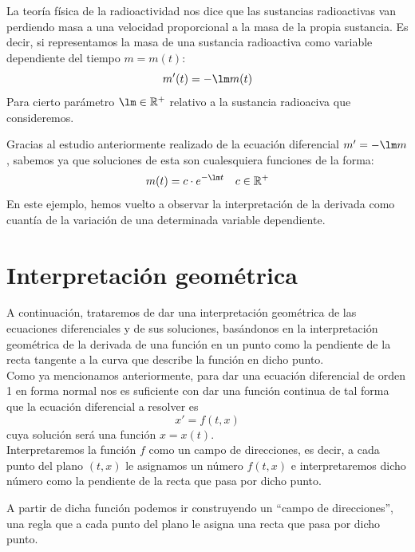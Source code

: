 \begin{ejemplo}
    La teoría física de la radioactividad nos dice que las sustancias radioactivas van perdiendo masa a una velocidad proporcional a la masa de la propia sustancia. Es decir, si representamos la masa de una sustancia radioactiva como variable dependiente del tiempo $m=m(t)$:
    \begin{equation*}
        m'(t) = -\lm m(t)
    \end{equation*}
    Para cierto parámetro $\lm \in \mathbb{R}^+$ relativo a la sustancia radioaciva que consideremos.

    Gracias al estudio anteriormente realizado de la ecuación diferencial $m' = -\lm m$, sabemos ya que soluciones de esta son cualesquiera funciones de la forma:
    \begin{equation*}
        m(t) = c\cdot e^{-\lm t}\quad c\in \mathbb{R}^+
    \end{equation*}
En este ejemplo, hemos vuelto a observar la interpretación de la derivada como cuantía de la variación de una determinada variable dependiente.
\end{ejemplo}

\section{Interpretación geométrica}
A continuación, trataremos de dar una interpretación geométrica de las ecuaciones diferenciales y de sus soluciones, basándonos en la interpretación geométrica de la derivada de una función en un punto como la pendiente de la recta tangente a la curva que describe la función en dicho punto.\\

Como ya mencionamos anteriormente, para dar una ecuación diferencial de orden 1 en forma normal nos es suficiente con dar una función
continua de tal forma que la ecuación diferencial a resolver es
\begin{equation*}
    x' = f(t,x)
\end{equation*}
cuya solución será una función $x = x(t)$.\\

Interpretaremos la función $f$ como un campo de direcciones, es decir, a cada punto del plano $(t,x)$ le asignamos un número $f(t,x)$ e interpretaremos dicho número como la pendiente de la recta que pasa por dicho punto.

A partir de dicha función podemos ir construyendo un ``campo de direcciones'', una regla que a cada punto del plano le asigna una recta que pasa por dicho punto.\\

